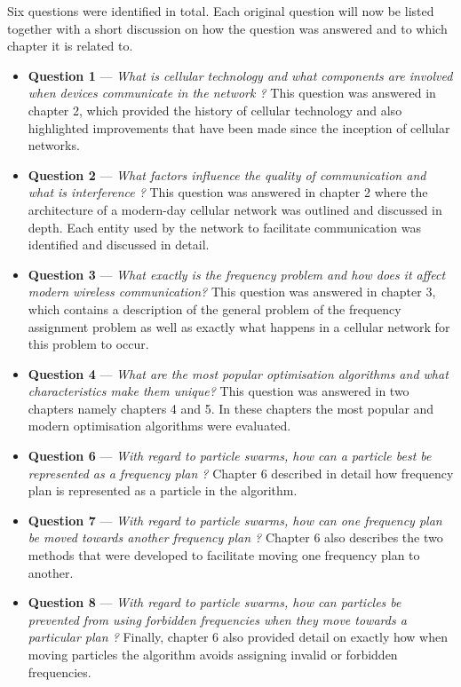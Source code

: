 Six questions were identified in total. Each original question will now be listed together with a short discussion on how the question was answered and to which chapter it is related to.
\begin{itemize}
\item \textbf{Question 1} --- \emph{What is cellular technology and what components are involved when devices communicate in the network ?} This question was answered in chapter 2, which provided the history of cellular technology and also highlighted improvements that have been made since the inception of cellular networks.
\item \textbf{Question 2} --- \emph{What factors influence the quality of communication and what is interference ?} This question was answered in chapter 2 where the architecture of a modern-day cellular network was outlined and discussed in depth. Each entity used by the network to facilitate communication was identified and discussed in detail.
\item \textbf{Question 3} --- \emph{What exactly is the frequency problem and how does it affect modern wireless communication? } This question was answered in chapter 3, which contains a description of the general problem of the frequency assignment problem as well as exactly what happens in a cellular network for this problem to occur.
\item \textbf{Question 4} --- \emph{What are the most popular optimisation algorithms and what characteristics make them unique?} This question was answered in two chapters namely chapters 4 and 5. In these chapters the most popular and modern optimisation algorithms were evaluated.
\item \textbf{Question 6} --- \emph{With regard to particle swarms, how can a particle best be represented as a frequency plan ?} Chapter 6 described in detail how frequency plan is represented as a particle in the algorithm.
\item \textbf{Question 7} --- \emph{With regard to particle swarms, how can one frequency plan be moved towards another frequency plan ?} Chapter 6 also describes the two methods that were developed to facilitate moving one frequency plan to another.
\item \textbf{Question 8} --- \emph{With regard to particle swarms, how can particles be prevented from using forbidden frequencies when they move towards a particular plan ?} Finally, chapter 6 also provided detail on exactly how when moving particles the algorithm avoids assigning invalid or forbidden frequencies.
\end{itemize}

